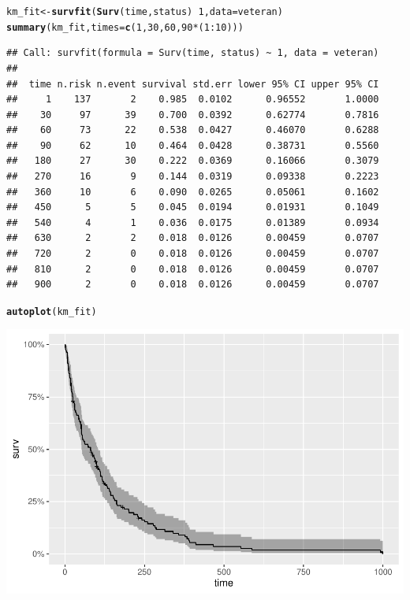 \documentclass[a4paper, oneside]{book}\usepackage[]{graphicx}\usepackage[]{color}
\makeatletter
\def\maxwidth{ %
  \ifdim\Gin@nat@width>\linewidth
    \linewidth
  \else
    \Gin@nat@width
  \fi
}
\newcommand{\hlnum}[1]{\textcolor[rgb]{0.686,0.059,0.569}{#1}}%
\newcommand{\hlopt}[1]{\textcolor[rgb]{0,0,0}{#1}}%
\newcommand{\hlstd}[1]{\textcolor[rgb]{0.345,0.345,0.345}{#1}}%
\newcommand{\hlkwb}[1]{\textcolor[rgb]{0.69,0.353,0.396}{#1}}%
\newcommand{\hlkwc}[1]{\textcolor[rgb]{0.333,0.667,0.333}{#1}}%
\newcommand{\hlkwd}[1]{\textcolor[rgb]{0.737,0.353,0.396}{\textbf{#1}}}%
\newenvironment{kframe}{%
 \def\at@end@of@kframe{}%
 \ifinner\ifhmode%
  \def\at@end@of@kframe{\end{minipage}}%
  \begin{minipage}{\columnwidth}%
 \fi\fi%
 \def\FrameCommand##1{\hskip\@totalleftmargin \hskip-\fboxsep
 \colorbox{shadecolor}{##1}\hskip-\fboxsep
     \hskip-\linewidth \hskip-\@totalleftmargin \hskip\columnwidth}%
 \MakeFramed {\advance\hsize-\width
   \@totalleftmargin\z@ \linewidth\hsize
   \@setminipage}}%
 {\par\unskip\endMakeFramed%
 \at@end@of@kframe}
\newenvironment{knitrout}{}{} %
\makeatother
\begin{document}
\begin{knitrout}
\color{fgcolor}\begin{kframe}
\begin{alltt}
\hlstd{km_fit} \hlkwb{<-} \hlkwd{survfit}\hlstd{(}\hlkwd{Surv}\hlstd{(time, status)} \hlopt{~} \hlnum{1}\hlstd{,} \hlkwc{data}\hlstd{=veteran)}
\hlkwd{summary}\hlstd{(km_fit,} \hlkwc{times} \hlstd{=} \hlkwd{c}\hlstd{(}\hlnum{1}\hlstd{,}\hlnum{30}\hlstd{,}\hlnum{60}\hlstd{,}\hlnum{90}\hlopt{*}\hlstd{(}\hlnum{1}\hlopt{:}\hlnum{10}\hlstd{)))}
\end{alltt}
\begin{verbatim}
## Call: survfit(formula = Surv(time, status) ~ 1, data = veteran)
## 
##  time n.risk n.event survival std.err lower 95% CI upper 95% CI
##     1    137       2    0.985  0.0102      0.96552       1.0000
##    30     97      39    0.700  0.0392      0.62774       0.7816
##    60     73      22    0.538  0.0427      0.46070       0.6288
##    90     62      10    0.464  0.0428      0.38731       0.5560
##   180     27      30    0.222  0.0369      0.16066       0.3079
##   270     16       9    0.144  0.0319      0.09338       0.2223
##   360     10       6    0.090  0.0265      0.05061       0.1602
##   450      5       5    0.045  0.0194      0.01931       0.1049
##   540      4       1    0.036  0.0175      0.01389       0.0934
##   630      2       2    0.018  0.0126      0.00459       0.0707
##   720      2       0    0.018  0.0126      0.00459       0.0707
##   810      2       0    0.018  0.0126      0.00459       0.0707
##   900      2       0    0.018  0.0126      0.00459       0.0707
\end{verbatim}
\begin{alltt}
\hlkwd{autoplot}\hlstd{(km_fit)}
\end{alltt}
\end{kframe}

{\centering \includegraphics[width=\maxwidth]{figure/script3-1} 

}



\end{knitrout}
\end{document}
